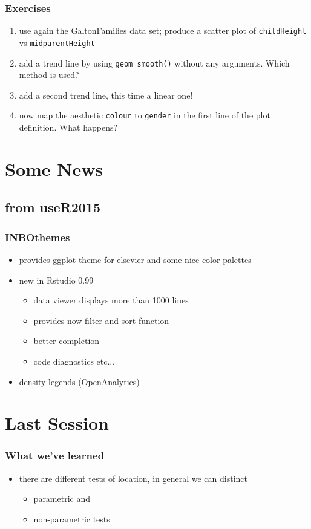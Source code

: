 \documentclass[xcolor={table}]{beamer}
\begin{document}
\begin{frame}[allowframebreaks]\frametitle{Exercises}
  \begin{enumerate}
  \item use again the GaltonFamilies data set; produce a scatter plot of \texttt{childHeight} vs \texttt{midparentHeight}
  \item add a trend line by using \texttt{geom\_smooth()} without any arguments. Which method is used?
  \item add a second trend line, this time a linear one!
  \item now map the aesthetic \texttt{colour} to \texttt{gender} in the first line of the plot definition. What happens?
  \end{enumerate}
\end{frame}

\section{Some News}
\subsection{from useR2015}

\begin{frame}\frametitle{INBOthemes}
  \begin{itemize}
  \item provides ggplot theme for elsevier and some nice color palettes
  \item new in Rstudio 0.99
    \begin{itemize}
    \item data viewer displays more than 1000 lines
    \item provides now filter and sort function
    \item better completion
    \item code diagnostics etc...
    \end{itemize}
  \item density legends (OpenAnalytics) 
  \end{itemize}

\end{frame}

\section{Last Session}

\begin{frame}\frametitle{What we've learned}
  \begin{itemize}
  \item there are different tests of location, in general we can distinct 
    \begin{itemize}
    \item parametric and
    \item non-parametric tests
    \end{itemize}
  \end{itemize}
\end{frame}
\end{document}
